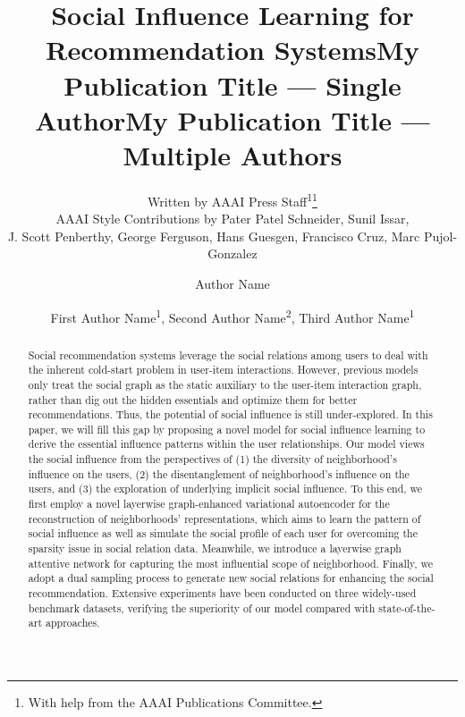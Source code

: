 \documentclass[letterpaper]{article} %
\title{Social Influence Learning for Recommendation Systems}
\author{
    Written by AAAI Press Staff\textsuperscript{\rm 1}\thanks{With help from the AAAI Publications Committee.}\\
    AAAI Style Contributions by Pater Patel Schneider,
    Sunil Issar,\\
    J. Scott Penberthy,
    George Ferguson,
    Hans Guesgen,
    Francisco Cruz\equalcontrib,
    Marc Pujol-Gonzalez\equalcontrib
}
\title{My Publication Title --- Single Author}
\author {
    Author Name
}
\title{My Publication Title --- Multiple Authors}
\author {
    First Author Name\textsuperscript{\rm 1},
    Second Author Name\textsuperscript{\rm 2},
    Third Author Name\textsuperscript{\rm 1}
}
\begin{document}
\maketitle

\begin{abstract}
Social recommendation systems leverage the social relations among users to deal with the inherent cold-start problem in user-item interactions. However, previous models only treat the social graph as the static auxiliary to the user-item interaction graph, rather than dig out the hidden essentials and optimize them for better recommendations. Thus, the potential of social influence is still under-explored. In this paper, we will fill this gap by proposing a novel model for social influence learning to derive the essential influence patterns within the user relationships. Our model views the social influence from the perspectives of (1) the diversity of neighborhood's influence on the users, (2) the disentanglement of neighborhood's influence on the users, and (3) the exploration of underlying implicit social influence. To this end, we first employ a novel layerwise graph-enhanced variational autoencoder for the reconstruction of neighborhoods' representations, which aims to learn the pattern of social influence as well as simulate the social profile of each user for overcoming the sparsity issue in social relation data. Meanwhile, we introduce a layerwise graph attentive network for capturing the most influential scope of neighborhood. Finally, we adopt a dual sampling process to generate new social relations for enhancing the social recommendation. Extensive experiments have been conducted on three widely-used benchmark datasets, verifying the superiority of our model compared with state-of-the-art approaches.
\end{abstract}
\end{document}
